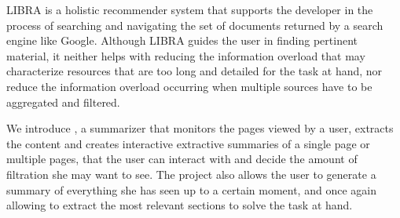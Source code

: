\label{sec:abstract}
LIBRA\cite{Ponz2017a} is a holistic recommender system that supports the developer in the process of searching and navigating the set of documents returned by a search engine like Google. Although LIBRA guides the user in finding pertinent material, it neither helps with reducing the information overload that may characterize resources that are too long and detailed for the task at hand, nor reduce the information overload occurring when multiple sources have to be aggregated and filtered. 

We introduce \projectName, a summarizer that monitors the pages viewed by a user, extracts the content and creates interactive extractive summaries of a single page or multiple pages, that the user can interact with and decide the amount of filtration she may want to see. The project also allows the user to generate a summary of everything she has seen up to a certain moment, and once again allowing to extract the most relevant sections to solve the task at hand.